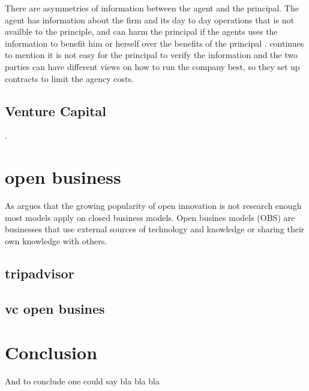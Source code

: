 \documentclass[a4paper, 11pt]{article}
\begin{document}
There are asymmetries of information between the agent and the principal. The
agent has information about the firm and its day to day operations that is not
availble to the principle, and can harm the principal if the agents uses the
information to benefit him or herself over the benefits of the principal
\citep{Osnabrugge2000}.\cite{Osnabrugge2000} continues to mention it is not
easy for the principal to verify the information and the two parties can have
different views on how to run the company best, so they set up contracts to
limit the agency costs.


\subsection{Venture Capital}



\citep{casson2008oxford}.

\section{open business}



As \cite{colombo2016open} argues that the growing popularity of open innovation is not research enough most models apply on closed business models. Open busines models (OBS) are businesses that use external sources of technology and knowledge or sharing their own knowledge with others. 


\subsection {tripadvisor}

\subsection {vc open busines}


\section{Conclusion}

And to conclude one could say bla bla bla


\renewcommand{\textbf}{}
\renewcommand{\bf}{}
{}
\end{document}
